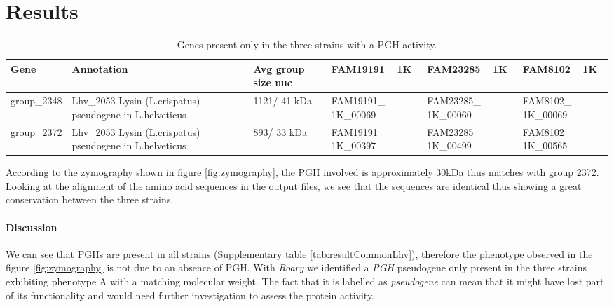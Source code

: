 \documentclass[10pt,a4paper]{article}
\begin{document}
\section*{\large Results}


\begin{table}[htbp]
	\centering
	\begin{tabularx}{\linewidth}{|X|X|X|X|X|X|}
		\hline
		\textbf{Gene} & \textbf{Annotation} & \textbf{Avg group size nuc} & \textbf{FAM19191\_ 1K} & \textbf{FAM23285\_ 1K} & \textbf{FAM8102\_ 1K}\\
		 \hline
		group\_2348 & Lhv\_2053 Lysin (L.crispatus) pseudogene in L.helveticus & 1121/ 41 kDa & FAM19191\_ 1K\_00069 & FAM23285\_ 1K\_00060 & FAM8102\_ 1K\_00069 \\
		\hline
		group\_2372 & Lhv\_2053 Lysin (L.crispatus) pseudogene in L.helveticus & 893/ 33 kDa & FAM19191\_ 1K\_00397 & FAM23285\_ 1K\_00499 & FAM8102\_ 1K\_00565 \\
		\hline	
	\end{tabularx}
	\caption{Genes present only in the three strains with a PGH activity.}
	\label{tab:resultPGHexpr}
\end{table}

\noindent According to the zymography shown in figure \ref{fig:zymography}, the PGH involved is approximately 30kDa thus matches with group 2372. Looking at the alignment of the amino acid sequences in the output files,
we see that the sequences are identical thus showing a great conservation between the three strains. \\












\paragraph{Discussion} We can see that PGHs are present in all strains (Supplementary table \ref{tab:resultCommonLhv}), therefore the phenotype observed in the figure \ref{fig:zymography} is not due to an absence of PGH. With \textit{Roary} we identified a \textit{PGH} pseudogene only present in the three strains exhibiting phenotype A with a matching molecular weight. The fact that it is labelled as \textit{pseudogene} can mean that it might have lost part of its functionality and would need further investigation to assess the protein activity.\\
\end{document}
